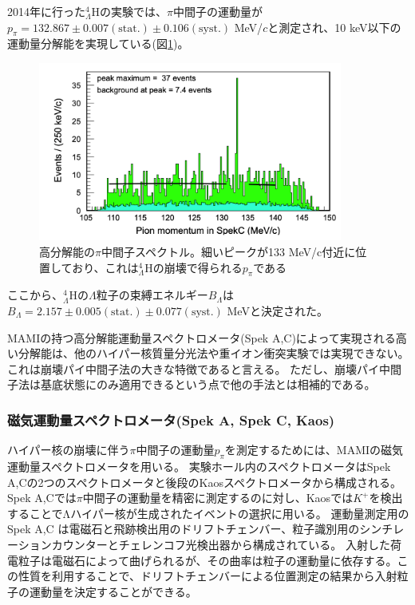 \documentclass[a4paper,11pt,uplatex]{jsbook}
\begin{document}
2014年に行った$^4_{\Lambda}\text{H}$の実験\cite{Schulz2015}では、$\pi$中間子の運動量が
$p_\pi = 132.867 \pm 0.007(\text{stat.}) \pm 0.106(\text{syst.})$ MeV/$c$と測定され、10 keV以下の運動量分解能を実現している(図\ref{fig:pi_spec})。
\begin{figure}[h]
  \centering
  \includegraphics[width=10cm]{image/1-PionSpectrum.png}
  \caption[過去実験での$p_\pi$スペクトル]{高分解能の$\pi$中間子スペクトル。細いピークが133 MeV/c付近に位置しており、これは$^4_{\Lambda}\text{H}$の崩壊で得られる$p_\pi$である\cite{Schulz2015}}
  \label{fig:pi_spec}
\end{figure}

ここから、$^4_{\Lambda}\text{H}$の$\Lambda$粒子の束縛エネルギー$B_\Lambda$は$B_\Lambda = 2.157 \pm 0.005(\text{stat.}) \pm 0.077(\text{syst.})$ MeVと決定された。

MAMIの持つ高分解能運動量スペクトロメータ(Spek A,C)によって実現される高い分解能は、他のハイパー核質量分光法や重イオン衝突実験では実現できない。
これは崩壊パイ中間子法の大きな特徴であると言える。
ただし、崩壊パイ中間子法は基底状態にのみ適用できるという点で他の手法とは相補的である。

\subsubsection{磁気運動量スペクトロメータ(Spek A, Spek C, Kaos)}
ハイパー核の崩壊に伴う$\pi$中間子の運動量$p_\pi$を測定するためには、MAMIの磁気運動量スペクトロメータを用いる。
実験ホール内のスペクトロメータはSpek A,Cの2つのスペクトロメータと後段のKaosスペクトロメータから構成される。Spek A,Cでは$\pi$中間子の運動量を精密に測定するのに対し、Kaosでは$K^+$を検出することでΛハイパー核が生成されたイベントの選択に用いる。
運動量測定用のSpek A,C は電磁石と飛跡検出用のドリフトチェンバー、粒子識別用のシンチレーションカウンターとチェレンコフ光検出器から構成されている。
入射した荷電粒子は電磁石によって曲げられるが、その曲率は粒子の運動量に依存する。この性質を利用することで、ドリフトチェンバーによる位置測定の結果から入射粒子の運動量を決定することができる。
\end{document}
